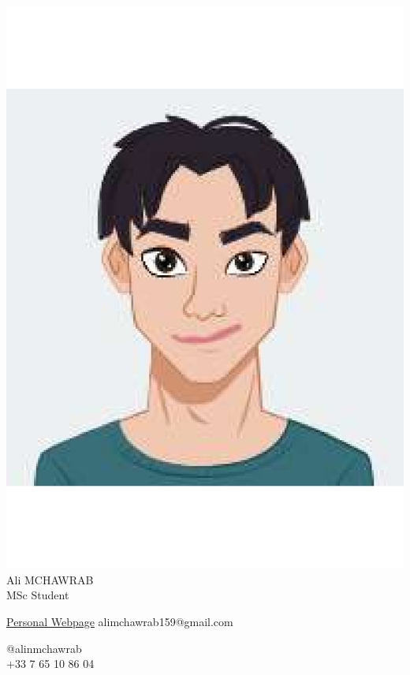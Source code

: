 \documentclass[8pt]{extarticle}
\begin{document}
\fontsize{6}{7}\selectfont
\centering
\includegraphics[width=0.18\linewidth]{logo}\\[-1pt]

Ali MCHAWRAB\\[-1pt]
MSc Student\\[3pt]

\begin{multicols}{2}
\raggedright
\href{https://ali-mchawrab159.github.io/}{Personal Webpage}
alimchawrab159@gmail.com


\columnbreak
\raggedleft
@alinmchawrab\\
+33 7 65 10 86 04\\

\end{multicols}
\end{document}
